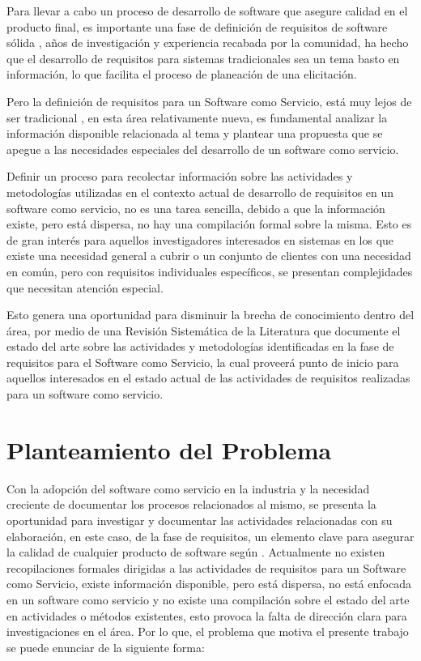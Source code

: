 \documentclass{article}
\begin{document}
Para llevar a cabo un proceso de desarrollo de software que asegure calidad en el producto final, es importante una fase de definición de requisitos de software sólida \cite{antecedentes4}, años de investigación y 
experiencia recabada por la comunidad, ha hecho que el desarrollo de requisitos para sistemas tradicionales sea un tema basto en información, lo que facilita el proceso de planeación de una elicitación.

Pero la definición de requisitos para un Software como Servicio, está muy lejos de ser tradicional \cite{antecedentes1}, en esta área relativamente nueva, es fundamental analizar la 
información disponible relacionada al tema y plantear una propuesta que se apegue a las necesidades especiales del desarrollo de un software como servicio. 

Definir un proceso para recolectar información sobre las actividades y metodologías utilizadas en el contexto actual de desarrollo de requisitos en un software como servicio, no es una tarea sencilla, debido a que la información existe, 
pero está dispersa, no hay una compilación formal sobre la misma. Esto es de gran interés para aquellos investigadores interesados 
en sistemas en los que existe una necesidad general a cubrir o un conjunto de clientes con una necesidad en común, pero con requisitos individuales específicos, se presentan complejidades que necesitan atención especial. 
 
Esto genera una oportunidad para disminuir la brecha de conocimiento dentro del área, por medio de una Revisión Sistemática de la Literatura que documente el estado del arte sobre las actividades y metodologías identificadas
en la fase de requisitos para el Software como Servicio, la cual proveerá punto de inicio para aquellos interesados en el estado actual de las actividades de requisitos realizadas para un software como servicio. 
\newpage

\section{Planteamiento del Problema}
Con la adopción del software como servicio en la industria y la necesidad creciente de documentar los procesos relacionados al mismo, se presenta la oportunidad para investigar y documentar las actividades 
relacionadas con su elaboración, en este caso, de la fase de requisitos, un elemento clave para asegurar la calidad de cualquier 
producto de software según \cite{antecedentes2}. Actualmente no existen recopilaciones formales dirigidas a las actividades de requisitos para un Software como Servicio, existe información disponible, 
pero está dispersa, no está enfocada en un software como servicio y no existe una compilación sobre el estado del arte en actividades o métodos existentes, esto provoca la falta de dirección 
clara para investigaciones en el área. Por lo que, el problema que motiva el presente trabajo se puede enunciar de la siguiente forma:\\
\end{document}
